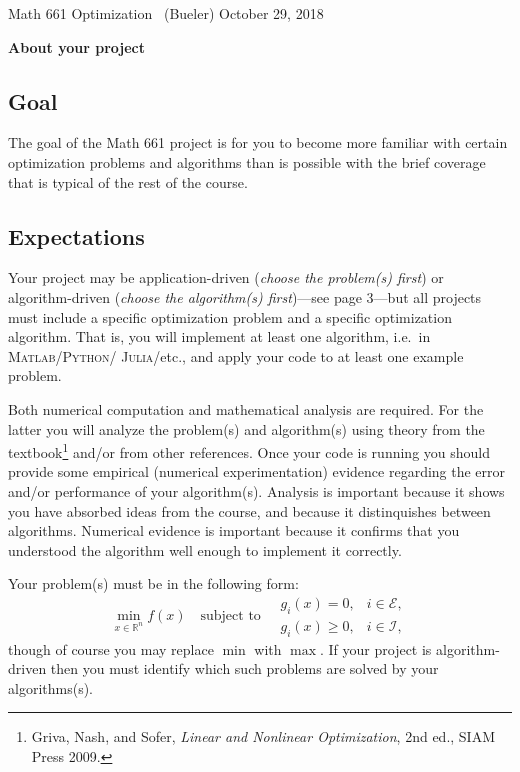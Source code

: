 \documentclass[12pt]{amsart}
\newcommand{\normalspacing}{\renewcommand{\baselinestretch}{1.05}
        \tiny\normalsize}
\newcommand{\RR}{\mathbb{R}}
\newcommand{\Matlab}{\textsc{Matlab}\xspace}
\newcommand{\Python}{\textsc{Python}\xspace}
\newcommand{\Julia}{\textsc{Julia}\xspace}
\begin{document}
\scriptsize \phantom{bob} \vspace{-0.3in}
\noindent Math 661 Optimization \, (Bueler) \hfill  October 29, 2018
\normalsize\bigskip
\normalspacing

\Large\centerline{\textbf{About your project}}
\normalsize

\bigskip\medskip
\thispagestyle{empty}
\normalspacing

\subsection*{Goal}  The goal of the Math 661 project is for you to become more familiar with certain optimization problems and algorithms than is possible with the brief coverage that is typical of the rest of the course.

\subsection*{Expectations}  Your project may be application-driven (\emph{choose the problem(s) first}) or algorithm-driven (\emph{choose the algorithm(s) first})---see page 3---but all projects must include a specific optimization problem and a specific optimization algorithm.  That is, you will implement at least one algorithm, i.e.~in \Matlab/\Python/ \Julia/etc., and apply your code to at least one example problem.

Both numerical computation and mathematical analysis are required.  For the latter you will analyze the problem(s) and algorithm(s) using theory from the textbook\footnote{Griva, Nash, and Sofer, \emph{Linear and Nonlinear Optimization}, 2nd ed., SIAM Press 2009.} and/or from other references.  Once your code is running you should provide some empirical (numerical experimentation) evidence regarding the error and/or performance of your algorithm(s).  Analysis is important because it shows you have absorbed ideas from the course, and because it distinquishes between algorithms.  Numerical evidence is important because it confirms that you understood the algorithm well enough to implement it correctly.

Your problem(s) must be in the following form:
\begin{equation}
\min_{x\in \RR^n} f(x) \quad \text{subject to} \quad \begin{matrix}
                                                      g_i(x) = 0, & i \in \mathcal{E}, \\
                                                      g_i(x) \ge 0, & i \in \mathcal{I},
                                                      \end{matrix}  \label{genform}
\end{equation}
though of course you may replace $\min$ with $\max$.  If your project is algorithm-driven then you must identify which such problems are solved by your algorithms(s).
\end{document}
